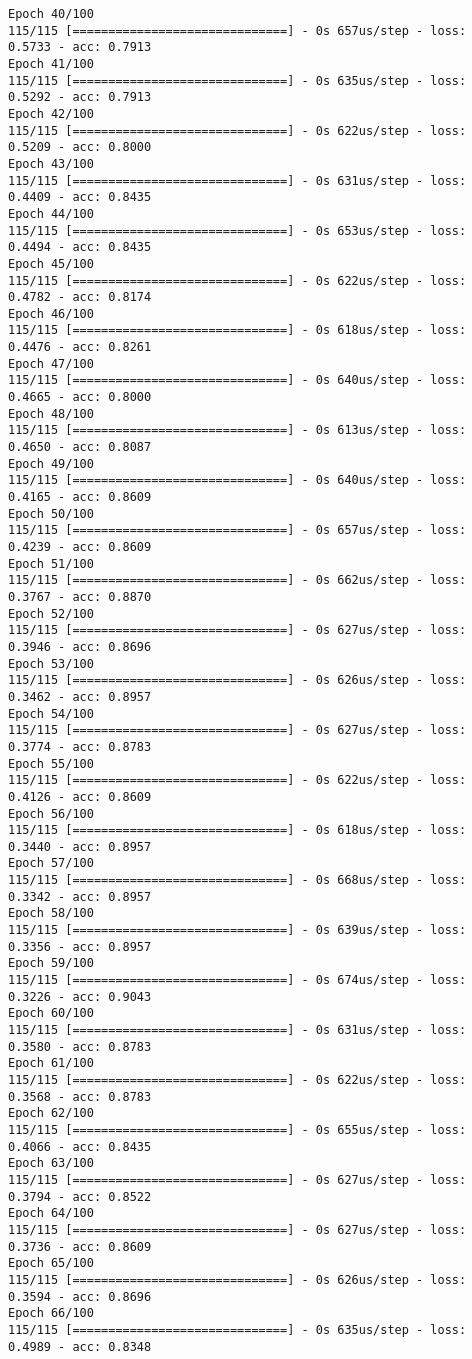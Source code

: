 \documentclass[11pt]{article}
\begin{document}
\begin{Verbatim}[commandchars=\\\{\}]
Epoch 40/100
115/115 [==============================] - 0s 657us/step - loss: 0.5733 - acc: 0.7913
Epoch 41/100
115/115 [==============================] - 0s 635us/step - loss: 0.5292 - acc: 0.7913
Epoch 42/100
115/115 [==============================] - 0s 622us/step - loss: 0.5209 - acc: 0.8000
Epoch 43/100
115/115 [==============================] - 0s 631us/step - loss: 0.4409 - acc: 0.8435
Epoch 44/100
115/115 [==============================] - 0s 653us/step - loss: 0.4494 - acc: 0.8435
Epoch 45/100
115/115 [==============================] - 0s 622us/step - loss: 0.4782 - acc: 0.8174
Epoch 46/100
115/115 [==============================] - 0s 618us/step - loss: 0.4476 - acc: 0.8261
Epoch 47/100
115/115 [==============================] - 0s 640us/step - loss: 0.4665 - acc: 0.8000
Epoch 48/100
115/115 [==============================] - 0s 613us/step - loss: 0.4650 - acc: 0.8087
Epoch 49/100
115/115 [==============================] - 0s 640us/step - loss: 0.4165 - acc: 0.8609
Epoch 50/100
115/115 [==============================] - 0s 657us/step - loss: 0.4239 - acc: 0.8609
Epoch 51/100
115/115 [==============================] - 0s 662us/step - loss: 0.3767 - acc: 0.8870
Epoch 52/100
115/115 [==============================] - 0s 627us/step - loss: 0.3946 - acc: 0.8696
Epoch 53/100
115/115 [==============================] - 0s 626us/step - loss: 0.3462 - acc: 0.8957
Epoch 54/100
115/115 [==============================] - 0s 627us/step - loss: 0.3774 - acc: 0.8783
Epoch 55/100
115/115 [==============================] - 0s 622us/step - loss: 0.4126 - acc: 0.8609
Epoch 56/100
115/115 [==============================] - 0s 618us/step - loss: 0.3440 - acc: 0.8957
Epoch 57/100
115/115 [==============================] - 0s 668us/step - loss: 0.3342 - acc: 0.8957
Epoch 58/100
115/115 [==============================] - 0s 639us/step - loss: 0.3356 - acc: 0.8957
Epoch 59/100
115/115 [==============================] - 0s 674us/step - loss: 0.3226 - acc: 0.9043
Epoch 60/100
115/115 [==============================] - 0s 631us/step - loss: 0.3580 - acc: 0.8783
Epoch 61/100
115/115 [==============================] - 0s 622us/step - loss: 0.3568 - acc: 0.8783
Epoch 62/100
115/115 [==============================] - 0s 655us/step - loss: 0.4066 - acc: 0.8435
Epoch 63/100
115/115 [==============================] - 0s 627us/step - loss: 0.3794 - acc: 0.8522
Epoch 64/100
115/115 [==============================] - 0s 627us/step - loss: 0.3736 - acc: 0.8609
Epoch 65/100
115/115 [==============================] - 0s 626us/step - loss: 0.3594 - acc: 0.8696
Epoch 66/100
115/115 [==============================] - 0s 635us/step - loss: 0.4989 - acc: 0.8348

\end{Verbatim}
\end{document}
